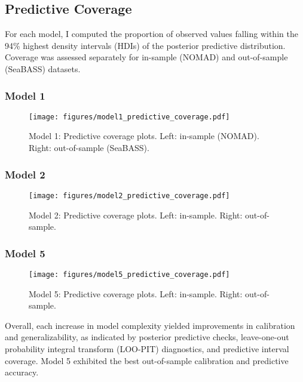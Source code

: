 \documentclass[preprint,authoryear]{elsarticle}
\begin{document}
\subsection{Predictive Coverage}

For each model, I computed the proportion of observed values falling within the 94\% highest density intervals (HDIs) of the posterior predictive distribution. Coverage was assessed separately for in-sample (NOMAD) and out-of-sample (SeaBASS) datasets.

\subsubsection{Model 1}

\begin{figure}[H]
\centering
\texttt{[image: figures/model1\_predictive\_coverage.pdf]}
\caption{Model 1: Predictive coverage plots. Left: in-sample (NOMAD). Right: out-of-sample (SeaBASS).}
\label{fig:model1-coverage}
\end{figure}

\subsubsection{Model 2}

\begin{figure}[H]
\centering
\texttt{[image: figures/model2\_predictive\_coverage.pdf]}
\caption{Model 2: Predictive coverage plots. Left: in-sample. Right: out-of-sample.}
\label{fig:model2-coverage}
\end{figure}

\subsubsection{Model 5}

\begin{figure}[H]
\centering
\texttt{[image: figures/model5\_predictive\_coverage.pdf]}
\caption{Model 5: Predictive coverage plots. Left: in-sample. Right: out-of-sample.}
\label{fig:model5-coverage}
\end{figure}

Overall, each increase in model complexity yielded improvements in calibration and generalizability, as indicated by posterior predictive checks, leave-one-out probability integral transform (LOO-PIT) diagnostics, and predictive interval coverage. Model 5 exhibited the best out-of-sample calibration and predictive accuracy. 
\end{document}
